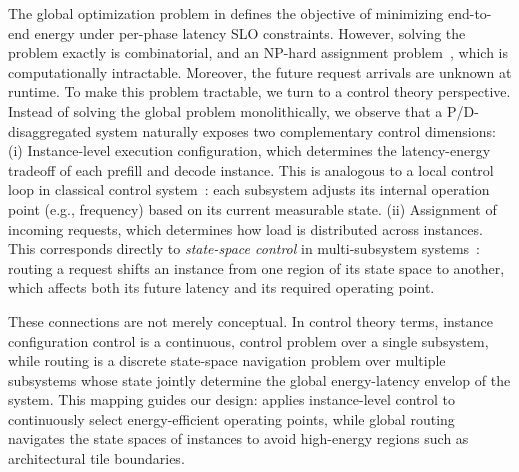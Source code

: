The global optimization problem in  defines the objective of minimizing end-to-end energy under per-phase latency SLO constraints. However, solving the problem exactly is combinatorial, and an NP-hard assignment problem~\cite{ross1975branch}, which is computationally intractable. Moreover, the future request arrivals are unknown at runtime. To make this problem tractable, we turn to a control theory perspective. Instead of solving the global problem monolithically, we observe that a P/D-disaggregated system naturally exposes two complementary control dimensions: (i) Instance-level execution configuration, which determines the latency-energy tradeoff of each prefill and decode instance. This is analogous to a local control loop in classical control system~\cite{wiener2019cybernetics}: each subsystem adjusts its internal operation point (e.g., frequency) based on its current measurable state. (ii) Assignment of incoming requests, which determines how load is distributed across instances. This corresponds directly to \emph{state-space control} in multi-subsystem systems~\cite{kalman1960general,kreindler1963contributions}: routing a request shifts an instance from one region of its state space to another, which affects both its future latency and its required operating point. 

These connections are not merely conceptual. In control theory terms, instance configuration control is a continuous,  control problem over a single subsystem, while routing is a discrete state-space navigation problem over multiple subsystems whose state jointly determine the global energy-latency envelop of the system. This mapping guides our design: \name applies instance-level control to continuously select energy-efficient operating points, while global routing navigates the state spaces of instances to avoid high-energy regions such as architectural tile boundaries. 


